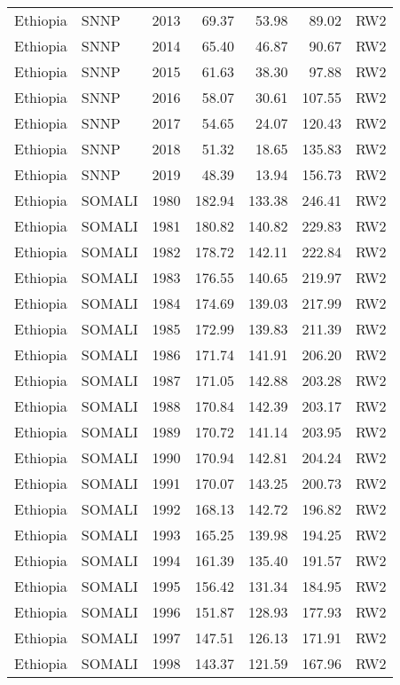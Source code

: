 \begin{longtable}{lllrrrl}
  Ethiopia & SNNP & 2013 & 69.37 & 53.98 & 89.02 & RW2 \\ 
  Ethiopia & SNNP & 2014 & 65.40 & 46.87 & 90.67 & RW2 \\ 
  Ethiopia & SNNP & 2015 & 61.63 & 38.30 & 97.88 & RW2 \\ 
  Ethiopia & SNNP & 2016 & 58.07 & 30.61 & 107.55 & RW2 \\ 
  Ethiopia & SNNP & 2017 & 54.65 & 24.07 & 120.43 & RW2 \\ 
  Ethiopia & SNNP & 2018 & 51.32 & 18.65 & 135.83 & RW2 \\ 
  Ethiopia & SNNP & 2019 & 48.39 & 13.94 & 156.73 & RW2 \\ 
  Ethiopia & SOMALI & 1980 & 182.94 & 133.38 & 246.41 & RW2 \\ 
  Ethiopia & SOMALI & 1981 & 180.82 & 140.82 & 229.83 & RW2 \\ 
  Ethiopia & SOMALI & 1982 & 178.72 & 142.11 & 222.84 & RW2 \\ 
  Ethiopia & SOMALI & 1983 & 176.55 & 140.65 & 219.97 & RW2 \\ 
  Ethiopia & SOMALI & 1984 & 174.69 & 139.03 & 217.99 & RW2 \\ 
  Ethiopia & SOMALI & 1985 & 172.99 & 139.83 & 211.39 & RW2 \\ 
  Ethiopia & SOMALI & 1986 & 171.74 & 141.91 & 206.20 & RW2 \\ 
  Ethiopia & SOMALI & 1987 & 171.05 & 142.88 & 203.28 & RW2 \\ 
  Ethiopia & SOMALI & 1988 & 170.84 & 142.39 & 203.17 & RW2 \\ 
  Ethiopia & SOMALI & 1989 & 170.72 & 141.14 & 203.95 & RW2 \\ 
  Ethiopia & SOMALI & 1990 & 170.94 & 142.81 & 204.24 & RW2 \\ 
  Ethiopia & SOMALI & 1991 & 170.07 & 143.25 & 200.73 & RW2 \\ 
  Ethiopia & SOMALI & 1992 & 168.13 & 142.72 & 196.82 & RW2 \\ 
  Ethiopia & SOMALI & 1993 & 165.25 & 139.98 & 194.25 & RW2 \\ 
  Ethiopia & SOMALI & 1994 & 161.39 & 135.40 & 191.57 & RW2 \\ 
  Ethiopia & SOMALI & 1995 & 156.42 & 131.34 & 184.95 & RW2 \\ 
  Ethiopia & SOMALI & 1996 & 151.87 & 128.93 & 177.93 & RW2 \\ 
  Ethiopia & SOMALI & 1997 & 147.51 & 126.13 & 171.91 & RW2 \\ 
  Ethiopia & SOMALI & 1998 & 143.37 & 121.59 & 167.96 & RW2 \\ 

\end{longtable}

